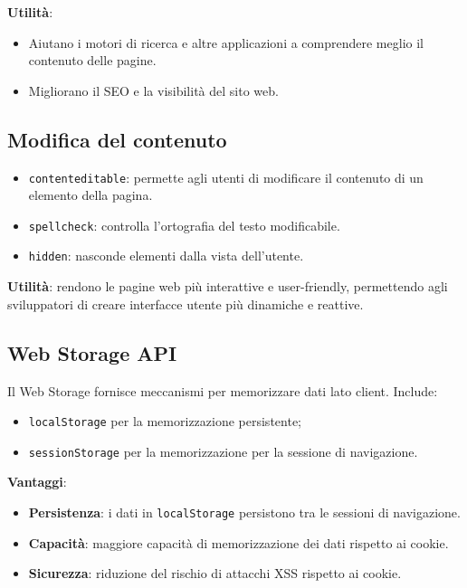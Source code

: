 \textbf{Utilità}:
\begin{itemize}
    \item Aiutano i motori di ricerca e altre applicazioni a comprendere meglio il contenuto delle pagine.
    \item Migliorano il SEO e la visibilità del sito web.
\end{itemize}

\subsection{Modifica del contenuto}

\begin{itemize}
    \item \texttt{contenteditable}: permette agli utenti di modificare il contenuto di un elemento della pagina.
    \item \texttt{spellcheck}: controlla l'ortografia del testo modificabile.
    \item \texttt{hidden}: nasconde elementi dalla vista dell'utente.
\end{itemize}

\textbf{Utilità}: rendono le pagine web più interattive e user-friendly, permettendo agli sviluppatori di creare interfacce utente più dinamiche e reattive.

\subsection{Web Storage API}

Il Web Storage fornisce meccanismi per memorizzare dati lato client. Include:
\begin{itemize}
    \item \texttt{localStorage} per la memorizzazione persistente;
    \item \texttt{sessionStorage} per la memorizzazione per la sessione di navigazione.
\end{itemize}

\textbf{Vantaggi}:
\begin{itemize}
    \item \textbf{Persistenza}: i dati in \texttt{localStorage} persistono tra le sessioni di navigazione.
    \item \textbf{Capacità}: maggiore capacità di memorizzazione dei dati rispetto ai cookie.
    \item \textbf{Sicurezza}: riduzione del rischio di attacchi XSS rispetto ai cookie.
\end{itemize}

